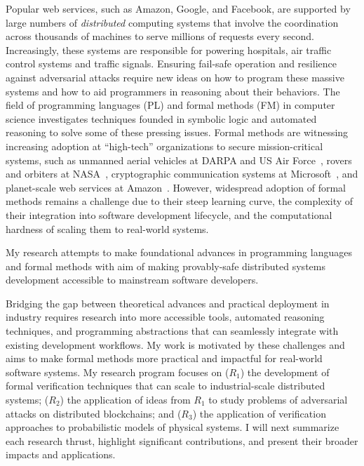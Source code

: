 Popular web services, such as Amazon, Google, and Facebook, are supported
by large numbers of \emph{distributed} computing systems that involve the
coordination across thousands of machines to serve millions of requests
every second. Increasingly, these systems are responsible for powering
hospitals, air traffic control systems and traffic signals. Ensuring
fail-safe operation and resilience against adversarial attacks require new
ideas on how to program these massive systems and how to aid programmers in
reasoning about their behaviors. The field of programming languages (PL)
and formal methods (FM) in computer science investigates techniques founded
in symbolic logic and automated reasoning to solve some of these pressing
issues. Formal methods are witnessing increasing adoption at ``high-tech''
organizations to secure mission-critical systems, such as unmanned aerial
vehicles at DARPA and US Air Force~\cite{darpa-hacms,darpa-airforce},
rovers and orbiters at NASA~\cite{nasa-fm}, cryptographic communication
systems at Microsoft~\cite{project-everest}, and planet-scale web services
at Amazon~\cite{aws-formal}. However, widespread adoption of formal methods
remains a challenge due to their steep learning curve, the complexity of
their integration into software development lifecycle, and the
computational hardness of scaling them to real-world systems.
\begin{mdquote}
My research attempts to make foundational advances in programming languages
and formal methods with aim of making provably-safe distributed systems
development accessible to mainstream software developers.
\end{mdquote}
\noindent Bridging the gap between theoretical advances and practical
deployment in industry requires research into more accessible tools,
automated reasoning techniques, and programming abstractions that can
seamlessly integrate with existing development workflows. My work is
motivated by these challenges and aims to make formal methods more
practical and impactful for real-world software systems. My research
program focuses on ($R_1$) the development of formal verification
techniques that can scale to industrial-scale distributed systems; ($R_2$)
the application of ideas from $R_1$ to study problems of adversarial
attacks on distributed blockchains; and ($R_3$) the application of
verification approaches to probabilistic models of physical systems. I will
next summarize each research thrust, highlight significant contributions,
and present their broader impacts and applications. 

